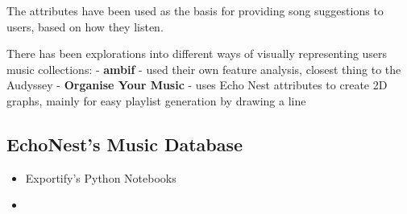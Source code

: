 The attributes have been used as the basis for providing song suggestions to users, based on how they listen.

There has been explorations into different ways of visually representing users music collections:
- \textbf{ambif} - used their own feature analysis, closest thing to the Audyssey
- \textbf{Organise Your Music} - uses Echo Nest attributes to create 2D graphs, mainly for easy playlist generation by drawing a line

\subsection{EchoNest's Music Database}

\begin{itemize}
    \item Exportify's Python Notebooks
    \item 
\end{itemize}

\section{}
